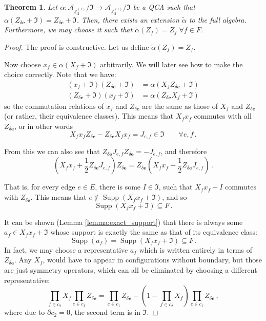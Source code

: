 \documentclass[10pt,a4paper]{amsart}
\newtheorem{theorem}{Theorem}
\newcommand{\Z}{{\mathbb Z}}
\newcommand{\be}{\begin{equation}}
\newcommand{\ee}{\end{equation}}
\newcommand{\mc}[1]{\mathcal{#1}}
\newcommand{\paren}[1]{\left( #1 \right)}
\begin{document}
\begin{theorem}\label{thm:QCA_extendability}
 Let $\alpha : \mc{A}_{\Z_2^{(1)}} / \mathfrak{I} \rightarrow \mc{A}_{\Z_2^{(1)}} / \mathfrak{I}$ be a QCA such that $\alpha(Z_{\delta \bm{e}} + \mathfrak{I}) = Z_{\delta \bm{e}} + \mathfrak{I}$. Then, there exists an extension $\tilde{\alpha}$ to the full algebra. Furthermore, we may choose it such that $\tilde{\alpha}(Z_f) = Z_f \; \forall f \in F$.
\end{theorem}

\begin{proof}
 The proof is constructive. Let us define $\tilde{\alpha}(Z_f) = Z_f$.

 Now choose $x_f \in \alpha(X_f + \mathfrak{I})$ arbitrarily. We will later see how to make the choice correctly. Note that we have:
 \begin{align}
 (x_f + \mathfrak{I}) (Z_{\delta \bm{e}} + \mathfrak{I}) &= \alpha(X_f Z_{\delta \bm{e}} + \mathfrak{I}) \nonumber \\
 (Z_{\delta \bm{e}} + \mathfrak{I}) (x_f + \mathfrak{I}) &= \alpha(Z_{\delta \bm{e}} X_f + \mathfrak{I})
 \end{align}
 so the commutation relations of $x_f$ and $Z_{\delta \bm{e}}$ are the same as those of $X_f$ and $Z_{\delta \bm{e}}$ (or rather, their equivalence classes). This means that $X_f x_f$ commutes with all $Z_{\delta \bm{e}}$, or in other words
 \be
 X_f x_f Z_{\delta \bm{e}} - Z_{\delta \bm{e}} X_f x_f = J_{e, f} \in \mathfrak{I} \qquad \forall e, f \,.
 \ee

 From this we can also see that $Z_{\delta \bm{e}} J_{e, f} Z_{\delta \bm{e}} = - J_{e, f}$, and therefore
 \be
 \paren{X_f x_f + \frac{1}{2} Z_{\delta \bm{e}} J_{e, f}} Z_{\delta \bm{e}} = Z_{\delta \bm{e}} \paren{X_f x_f + \frac{1}{2} Z_{\delta \bm{e}} J_{e, f}} \,.
 \ee

 That is, for every edge $e \in E$, there is some $I \in \mathfrak{I}$, such that $X_f x_f + I$ commutes with $Z_{\delta \bm{e}}$. This means that $e \notin \operatorname{Supp}(X_f x_f + \mathfrak{I})$, and so
 \be
 \operatorname{Supp}(X_f x_f + \mathfrak{I}) \subseteq F \,.
 \ee

 It can be shown (Lemma \ref{lemma:exact_support}) that there is always some $a_f \in X_f x_f + \mathfrak{I}$ whose support is exactly the same as that of its equivalence class:
 \be
 \operatorname{Supp}(a_f) = \operatorname{Supp}(X_f x_f + \mathfrak{I}) \subseteq F \,.
 \ee
 In fact, we may choose a representative $a_f$ which is written entirely in terms of $Z_{\delta \bm{e}}$. Any $X_f$, would have to appear in configurations without boundary, but those are just symmetry operators, which can all be eliminated by choosing a different representative:
 \be
 \prod_{f \in c_2} X_f \prod_{e \in c_1} Z_{\delta \bm{e}} = \prod_{e \in c_1} Z_{\delta \bm{e}} - \paren{1 - \prod_{f \in c_2} X_f} \prod_{e \in c_1} Z_{\delta \bm{e}} \,,
 \ee
 where due to $\partial c_2 = 0$, the second term is in $\mathfrak{I}$.


\end{proof}
\end{document}

